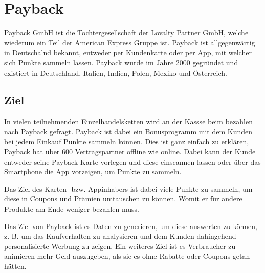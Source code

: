 \section{Payback} \label{Payback}
Payback GmbH ist die Tochtergesellschaft der Lovalty Partner GmbH, welche wiederum ein Teil der American Express Gruppe ist. \cite{Payback_Info} Payback ist allgegenwärtig in Deutschalnd bekannt, entweder per Kundenkarte oder per App, mit welcher sich Punkte sammeln lassen. \newline
\noindent Payback wurde im Jahre 2000 gegründet und existiert in Deutschland, Italien, Indien, Polen, Mexiko und Österreich. \cite{Payback_Info} \newline

\subsection{Ziel}
In vielen teilnehmenden Einzelhandelsketten wird an der Kassse beim bezahlen nach Payback gefragt. Payback ist dabei ein Bonusprogramm mit dem Kunden bei jedem Einkauf Punkte sammeln können. Dies ist ganz einfach zu erklären, Payback hat über 600 Vertragspartner offline wie online. Dabei kann der Kunde entweder seine Payback Karte vorlegen und diese einscannen lassen oder über das Smartphone die App vorzeigen, um Punkte zu sammeln. \cite{Payback} \newline

\noindent Das Ziel des Karten- bzw. Appinhabers ist dabei viele Punkte zu sammeln, um diese in Coupons und Prämien umtauschen zu können. Womit er für andere Produkte am Ende weniger bezahlen muss. \newline

\noindent Das Ziel von Payback ist es Daten zu generieren, um diese auswerten zu können, z. B. um das Kaufverhalten zu analysieren und dem Kunden dahingehend personalisierte Werbung zu zeigen. Ein weiteres Ziel ist es Verbraucher zu animieren mehr Geld auszugeben, als sie es ohne Rabatte oder Coupons getan hätten. \cite{web}


